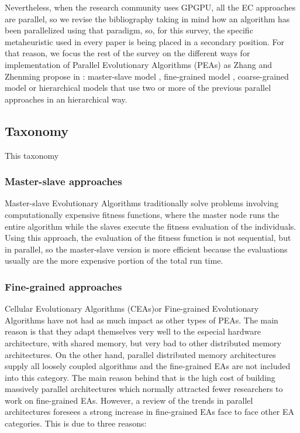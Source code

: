 \documentclass[Afour,sageh,times]{sagej}
\begin{document}
Nevertheless, when the research community uses GPGPU, all the EC approaches are parallel, so we revise the bibliography taking in mind how an algorithm has been parallelized using that paradigm, so, for this survey, the specific metaheuristic used in every paper is being placed in a secondary position.  For that reason, we focus the rest of the survey on the different ways for implementation of Parallel Evolutionary Algorithms (PEAs) as Zhang and Zhenming propose in \citep{ZhangImplementationMasterSlave}: master-slave model \citep{man-leung-wong-parallel-2005}, fine-grained model \citep{jian_ming_li_efficient_2007}, coarse-grained model \citep{Maitre:2009:CGP:1569901_1570089} \citep{pospichalParallelGeneticAlgorithOnCUDA2010} or hierarchical models  \citep{DBLP:conf/gecco/PospichalMOSJ11} that use two or more of the previous parallel approaches in an hierarchical way. 

\subsection{Taxonomy}
This taxonomy %

\subsubsection{Master-slave approaches}
Master-slave Evolutionary Algorithms traditionally solve problems involving computationally expensive fitness functions, where the master node runs the entire algorithm while the slaves execute the fitness evaluation of the individuals. Using this approach, the evaluation of the fitness function is not sequential, but in parallel, so the master-slave version is more efficient because the evaluations usually are the more expensive portion of the total run time.

\subsubsection{Fine-grained approaches}
Cellular Evolutionary Algorithms (CEAs)or Fine-grained Evolutionary Algorithms have not had as much impact as other types of PEAs. The main reason is that they adapt themselves very well to the especial hardware architecture, with shared memory, but very bad to other distributed memory architectures. On the other hand, parallel distributed memory architectures supply all loosely coupled algorithms and the fine-grained EAs are not included into this category. The main reason behind that is the high cost of building massively parallel architectures which normally attracted fewer researchers to work on fine-grained EAs. However, a review of the trends in parallel architectures foresees a strong increase in fine-grained EAs face to face other EA categories. This is due to three reasons: 
\end{document}
